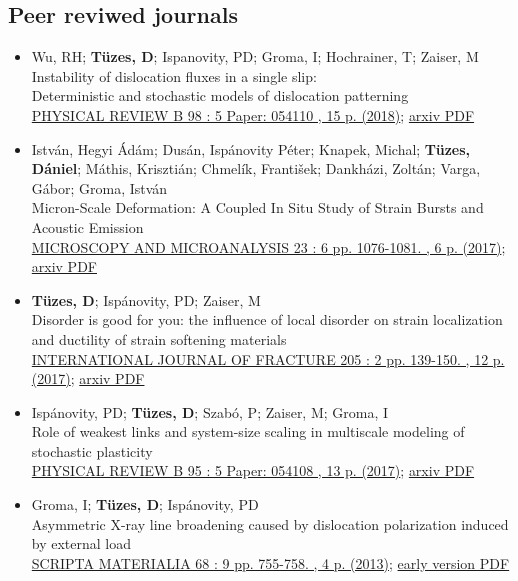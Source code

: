 \documentclass[10pt,a4paper,sans]{moderncv}        %
\begin{document}
\subsection{Peer reviwed journals}
\begin{itemize}
\item Wu, RH; \textbf{Tüzes, D}; Ispanovity, PD; Groma, I; Hochrainer, T; Zaiser, M\\
	Instability of dislocation fluxes in a single slip:\\
	Deterministic and stochastic models of dislocation patterning\\
    \href{https://journals.aps.org/prb/abstract/10.1103/PhysRevB.98.054110}{PHYSICAL REVIEW B 98 : 5 Paper: 054110 , 15 p. (2018)};
    \href{https://arxiv.org/pdf/1708.05533}{arxiv PDF}
\item István, Hegyi Ádám; Dusán, Ispánovity Péter; Knapek, Michal; \textbf{Tüzes, Dániel}; Máthis, Krisztián; Chmelík, František; Dankházi, Zoltán; Varga, Gábor; Groma, István\\
    Micron-Scale Deformation: A Coupled In Situ Study of Strain Bursts and Acoustic Emission\\
    \href{https://www.cambridge.org/core/journals/microscopy-and-microanalysis/article/micronscale-deformation-a-coupled-in-situ-study-of-strain-bursts-and-acoustic-emission/DAF84F7E4CC7C2A211E39A1FFBCCB2D0}{MICROSCOPY AND MICROANALYSIS 23 : 6 pp. 1076-1081. , 6 p. (2017)};
    \href{https://arxiv.org/pdf/1604.01815}{arxiv PDF}
\item \textbf{Tüzes, D}; Ispánovity, PD; Zaiser, M\\
    Disorder is good for you: the influence of local disorder on strain localization and ductility of strain softening materials\\
    \href{https://link.springer.com/article/10.1007\%2Fs10704-017-0187-1}{INTERNATIONAL JOURNAL OF FRACTURE 205 : 2 pp. 139-150. , 12 p. (2017)};
    \href{https://arxiv.org/pdf/1604.01821}{arxiv PDF}
\item Ispánovity, PD; \textbf{Tüzes, D}; Szabó, P; Zaiser, M; Groma, I\\
    Role of weakest links and system-size scaling in multiscale modeling of stochastic plasticity\\
    \href{https://journals.aps.org/prb/abstract/10.1103/PhysRevB.95.054108}{PHYSICAL REVIEW B 95 : 5 Paper: 054108 , 13 p. (2017)};
    \href{https://arxiv.org/pdf/1604.01645}{arxiv PDF}
\item Groma, I; \textbf{Tüzes, D}; Ispánovity, PD\\
    Asymmetric X-ray line broadening caused by dislocation polarization induced by external load\\
    \href{https://www.sciencedirect.com/science/article/pii/S1359646213000110}{SCRIPTA MATERIALIA 68 : 9 pp. 755-758. , 4 p. (2013)}; \href{http://metal.elte.hu/~tuzes/docs/pre\%20AsymmetricX-ray\%20line\%20broadening\%20caused\%20by\%20dislocation\%20polarization\%20induced\%20by\%20external\%20load.pdf}{early version PDF}
\end{itemize}
    
\end{document}
